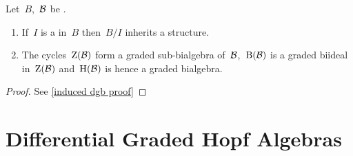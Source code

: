 \documentclass[a4paper,10pt,headings=standardclasses]{scrartcl}
\begin{document}

\begin{proposition}
  \label{induced dgb}
  Let~$B$,~$\mathcal{B}$ be {\dgbs}.
  \begin{enumerate}
    \item
      If~$I$ is a {\dgbi} in~$B$ then~$B/I$ inherits a {\dgb} structure.
    \item
      The cycles~$\operatorname{Z}(\mathcal{B})$ form a graded sub-bialgebra of~$\mathcal{B}$,~$\operatorname{B}(\mathcal{B})$ is a graded biideal in~$\operatorname{Z}(\mathcal{B})$ and~$\operatorname{H}(\mathcal{B})$ is hence a graded bialgebra.
  \end{enumerate}
\end{proposition}

\begin{proof}
  See \cref{induced dgb proof}
\end{proof}





\section{Differential Graded Hopf Algebras}
\end{document}
